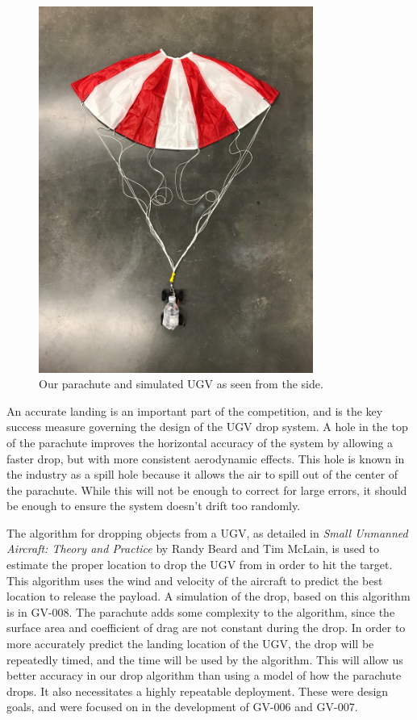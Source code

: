 \documentclass[]{auvsi_doc}
\begin{document}
\begin{figure}[h]
\centering
\includegraphics[width=90mm]{./figs/Parachute_Side.jpg}
\caption{Our parachute and simulated UGV as seen from the side.}
\label{fig:side}
\end{figure}

An accurate landing is an important part of the competition, and is the key success measure governing the design of the UGV drop system.
A hole in the top of the parachute improves the horizontal accuracy of the system by allowing a faster drop, but with more consistent aerodynamic effects.
This hole is known in the industry as a spill hole because it allows the air to spill out of the center of the parachute. 
 While this will not be enough to correct for large errors, it should be enough to ensure the system doesn't drift  too randomly. 
 
 The algorithm for dropping objects from a UGV, as detailed in \textit{Small Unmanned Aircraft: Theory and Practice} by Randy Beard and Tim McLain, is used to estimate the proper location to drop the UGV from in order to hit the target. This algorithm uses the wind and velocity of the aircraft to predict the best location to release the payload. A simulation of the drop, based on this algorithm is in GV-008. 
 The parachute adds some complexity to the algorithm, since the surface area and coefficient of drag are not constant during the drop. In order to more accurately predict the landing location of the UGV, the drop will be repeatedly timed, and the time will be used by the algorithm. This will allow us better accuracy in our drop algorithm than using a model of how the parachute drops. It also necessitates a highly repeatable deployment. These were design goals, and were focused on in the development of GV-006 and GV-007.
\end{document}
